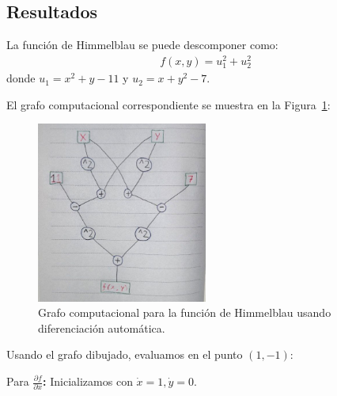 \documentclass{article}
\begin{document}
\subsection{Resultados}
\setcounter{equation}{0}

La función de Himmelblau se puede descomponer como:
\begin{align}
f(x,y) = u_1^2 + u_2^2
\end{align}
donde $u_1 = x^2 + y - 11$ y $u_2 = x + y^2 - 7$.

El grafo computacional correspondiente se muestra en la Figura~\ref{fig:grafo_himmelblau}:

\begin{figure}[H]
\centering
\includegraphics[width=0.5\textwidth]{images/10_autodiff.jpg}
\caption{Grafo computacional para la función de Himmelblau usando diferenciación automática.}
\label{fig:grafo_himmelblau}
\end{figure}

Usando el grafo dibujado, evaluamos en el punto $(1,-1)$:

Para\textbf{ $\frac{\partial f}{\partial x}$:}
Inicializamos con $\dot{x} = 1, \dot{y} = 0$.
\end{document}
